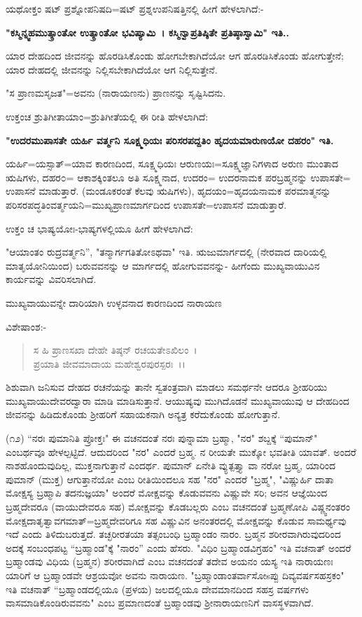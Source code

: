 ಯಥೋಕ್ತಂ ಷಟ್ ಪ್ರಶ್ನೋಪನಿಷದಿ=ಷಟ್ ಪ್ರಶ್ನಉಪನಿಷತ್ತಿನಲ್ಲಿ ಹೀಗೆ ಹೇಳಲಾಗಿದೆ:-

\textbf{"ಕಸ್ಮಿನ್ನ್ವಹಮುತ್ಕ್ರಾಂತೋ ಉತ್ಕ್ರಾಂತೋ ಭವಿಷ್ಯಾಮಿ~। ಕಸ್ಮಿನ್ವಾಪ್ರತಿಷ್ಠಿತೇ ಪ್ರತಿಷ್ಠಾಸ್ವಾಮಿ" ಇತಿ..}

ಯಾರ ದೇಹದಿಂದ ಜೀವನನ್ನು ಹೊರಡಿಸಿಕೊಂಡು ಹೋಗಬೇಕಾಗಿದೆಯೋ ಆಗ ಹೊರಡಿಸಿಕೊಂಡು ಹೋಗುತ್ತೇನೆ; ಯಾರ ದೇಹದಲ್ಲಿ ಜೀವನನ್ನು ನಿಲ್ಲಿಸಬೇಕಾಗಿದೆಯೋ ಆಗ ನಿಲ್ಲಿಸುತ್ತೇನೆ.

"ಸ ಪ್ರಾಣಮಸೃಜತ"=ಅವನು (ನಾರಾಯಣನು) ಪ್ರಾಣನನ್ನು ಸೃಷ್ಟಿಸಿದನು.

ಉಕ್ತಂಚ ಶ್ರುತಿಗೀತಾಯಾಂ=ಶ್ರುತಿಗೀತೆಯಲ್ಲಿ ಈ ರೀತಿ ಹೇಳಲಾಗಿದೆ:

\textbf{"ಉದರಮುಪಾಸತೇ ಯರ್ಹಿ ವರ್ತ್ಮನಿ ಸೂಕ್ಷ್ಮಧಿಯಃ ಪರಿಸರಪದ್ದತಿಂ ಹೃದಯಮಾರುಣಯೋ ದಹರಂ" ಇತಿ.}

ಯರ್ಹಿ=ಯಸ್ಸಾತ್=ಯಾವ ಕಾರಣದಿಂದ, ಸೂಕ್ಷ್ಮಧಿಯಃ ಆರುಣಯಃ=ಸೂಕ್ಷ್ಮಜ್ಞಾನಿಗಳಾದ ಅರುಣ ಮುಂತಾದ ಋಷಿಗಳು, ದಹರ೦= ಆಕಾಶಕ್ಕಿಂತಲೂ ಅತಿ ಸೂಕ್ಷ್ಮನಾದ, ಉದರಂ= ಉದರನಾಮಕ ಪರಬ್ರಹ್ಮನನ್ನು ಉಪಾಸತೇ= ಉಪಾಸನೆ ಮಾಡುತ್ತಾರೆ. (ಮಂಡೂಕರಂತೆ ಕೆಲವು ಋಷಿಗಳು), ಹೃದಯಂ=ಹೃದಯನಾಮಕ ಪರಮಾತ್ಮನನ್ನು ಪರಿಸರಪದ್ಧತಿಂವರ್ತ್ಮಯನಿ=ಮುಖ್ಯಪ್ರಾಣಮಾರ್ಗದಿಂದ ಉಪಾಸತೇ=ಉಪಾಸನೆ ಮಾಡುತ್ತಾರೆ.

ಉಕ್ತಂ ಚ ಭಾಷ್ಯಯೋಃ-ಭಾಷ್ಯಗಳಲ್ಲಿಯೂ ಹೀಗೆ ಹೇಳಲಾಗಿದೆ:

"ಆಯಾಂತಂ ರುದ್ರವರ್ತ್ಮನಿ'', "ತನ್ಮಾರ್ಗಗತಿತೋಽಥವಾ" ಇತಿ. ಋಜುಮಾರ್ಗದಲ್ಲಿ (ನೇರವಾದ ದಾರಿಯಲ್ಲಿ ಮಾತೃಯೋನಿಯಿಂದ) ಬರುವವನನ್ನು ಆ ಮಾರ್ಗದಲ್ಲಿ ಹೋಗುವವನನ್ನು- ಹೀಗೆಂದು ಮುಖ್ಯವಾಯುವಿನ ಕಾರ್ಯವನ್ನು ವಿವರಿಸಲಾಗಿದೆ.

\begin{center}
ಮುಖ್ಯವಾಯುವನ್ನೇ ದಾರಿಯಾಗಿ ಉಳ್ಳವನಾದ ಕಾರಣದಿಂದ ನಾರಾಯಣ
\end{center}

\noindent
ವಿಶೇಷಾಂಶ:-

\begin{verse}
ಸ ಹಿ ಪ್ರಾಣಸಖಾ ದೇಹೇ ತಿಷ್ಠನ್ ರಚಯತೇಽಖಿಲಂ~।\\ ಪ್ರಯಾತಿ ಜೀವಮಾದಾಯ ಮಹೇಶ್ವರಪುರಸ್ಪರಃ~।।
\end{verse}


\noindent
ಶಿಶುವಾಗಿ ಜನಿಸುವ ದೇಹದ ರಚನೆಯನ್ನು ತಾನೇ ಸ್ವತಂತ್ರವಾಗಿ ಮಾಡಲು ಸಮರ್ಥನೇ ಆದರೂ ಶ‍್ರೀಹರಿಯು ಮುಖ್ಯವಾಯುದೇವರದ್ವಾರಾ ಮಾಡಿ ಮಾಡಿಸುತ್ತಾನೆ. ಆಯುಷ್ಯವು ಮುಗಿದೊಡನೆ ಮುಖ್ಯವಾಯುವು ಆ ದೇಹದಿಂದ ಜೀವನನ್ನು ಹಿಡಿದುಕೊಂಡು ಶ‍್ರೀಹರಿಗೆ ಸಹಾಯಕನಾಗಿ ಅನ್ಯತ್ರ ಕರೆದುಕೊಂಡು ಹೋಗುತ್ತಾನೆ.

(೧೨) “ನರಃ ಪುಮಾನಿತಿ ಪ್ರೋಕ್ತಃ" ಈ ವಚನದಂತೆ ನರಃ ಪುನ್ನಾಮಾ ಬ್ರಹ್ಮಾ, "ನರ" ಶಬ್ದಕ್ಕೆ “ಪುಮಾನ್" ಎಂಬರ್ಥವೂ ಹೇಳಲ್ಪಟ್ಟಿದೆ. ಆದುದರಿಂದ "ನರ" ಎಂದರೆ ಬ್ರಹ್ಮ. ನ ರೀಯತೇ ಮುಕ್ಕೋ ಭವತೀತಿ ಯಾವತ್. ಅಂದರೆ ನಾಶಹೊಂದುವುದಿಲ್ಲ, ಮುಕ್ತನಾಗುತ್ತಾನೆ ಎಂದರ್ಥ. ಪುಮಾನ್ ಏನೇತಿ ವ್ಯುತ್ಪತ್ತ್ಯಾ ವಾ ನರೋ ಬ್ರಹ್ಮ, ಯಾರಿಂದ ಪುಮಾನ್ (ಮುಕ್ತ) ಆಗುತ್ತಾನೆಯೋ ಎಂಬ ರೀತಿಯಿಂದಲೂ ಸಹ "ನರ" ಎಂದರೆ "ಬ್ರಹ್ಮ", "ವಿಷ್ಣುರ್ಹಿ ದಾತಾ ಮೋಕ್ಷಸ್ಯ ಬ್ರಹ್ಮಾಪಿ ತದನುಜ್ಞಯಾ" ಅಂದರೆ ಮೋಕ್ಷವನ್ನು ಕೊಡುವವನು ವಿಷ್ಣುವೇ ಸರಿ; ಅವನ ಆಜ್ಞೆಯಿಂದ ಬ್ರಹ್ಮದೇವರೂ (ವಾಯುದೇವರೂ ಸಹ) ಮೋಕ್ಷವನ್ನು ಕೊಡಬಲ್ಲರು ಎಂಬ ವಚನದಂತೆ ಬ್ರಹ್ಮಣೋಪಿ ವಿಷ್ಣ್ವನಂತರಂ ಮೋಕ್ಷದಾತೃತ್ವಾವಗಮಾತ್=ಬ್ರಹ್ಮದೇವರಿಗೂ ಸಹ ವಿಷ್ಣುವಿನ ಅನಂತರದಲ್ಲಿ ಮೋಕ್ಷವನ್ನು ಕೊಡುವ ಸಾಮರ್ಥ್ಯವು ಇದೆ ಎಂದು ತಿಳಿದುಬರುತ್ತದೆ. ತಚ್ಛರೀರತಯಾ ತತ್ಸಂಬಂಧಿ ಬ್ರಹ್ಮಾಂಡಂ ನಾರಂ. ಬ್ರಹ್ಮನ ಶರೀರವಾಗಿರುವುದರಿಂದ ಅದಕ್ಕೆ ಸಂಬಂಧಪಟ್ಟ “ಬ್ರಹ್ಮಾಂಡ"ಕ್ಕೆ "ನಾರಂ'' ಎಂದು ಹೆಸರು. "ವಿಧಿಂ ಬ್ರಹ್ಮಾಂಡವಿಗ್ರಹಂ" ಇತಿ ವಚನಾತ್ ಅಂದರೆ ಬ್ರಹ್ಮಾಂಡವು ವಿಧಿಯ (ಬ್ರಹ್ಮನ) ಶರೀರವಾಗಿದೆ ಎಂಬ ವಚನದಂತೆ ತದೇವ ಅಯನಂ ಯಸ್ಯ ಇತಿ ನಾರಾಯಣಃ ಯಾರಿಗೆ ಆ ಬ್ರಹ್ಮಾಂಡವೇ ಆಶ್ರಯವೋ ಅವನು ನಾರಾಯಣ. "ಬ್ರಹ್ಮಾಂಡಾಂತರ್ವಾಸೋsಪ್ಪು ದಿವ್ಯವರ್ಷಸಹಸ್ರಕಂ" ಇತಿ ವಚನಾತ್ “ಬ್ರಹ್ಮಾಂಡದಲ್ಲಿಯೂ (ಪ್ರಳಯ) ಜಲದಲ್ಲಿಯೂ ದೇವಮಾನದಿಂದ ಸಹಸ್ರ ವರ್ಷಗಳು ವಾಸಮಾಡಿಕೊಂಡಿರುವವನು" ಎಂಬ ಪ್ರಮಾಣದಂತೆ ಬ್ರಹ್ಮಾಂಡವು ಶ‍್ರೀನಾರಾಯಣನಿಗೆ ವಾಸಸ್ಥಳವಾಗಿದೆ.

